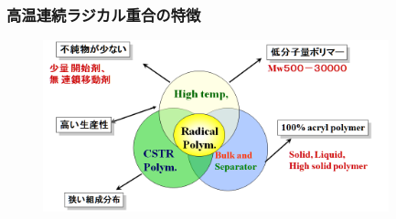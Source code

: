 \documentclass[unicode,12pt]{beamer}%
\begin{document}
%
\begin{frame}
	\frametitle{高温連続ラジカル重合の特徴}
		\begin{figure}[!b]
			\begin{center}
				\includegraphics[width=100mm]{tokutyo.png}
			\end{center}
		\end{figure}
\end{frame}
\end{document}
